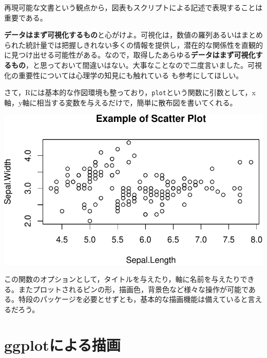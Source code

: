 \documentclass[
  a4paper,
]{ltjsbook}
\newenvironment{Shaded}{\begin{snugshade}}{\end{snugshade}}
\newcommand{\AttributeTok}[1]{\textcolor[rgb]{0.40,0.45,0.13}{#1}}
\newcommand{\FunctionTok}[1]{\textcolor[rgb]{0.28,0.35,0.67}{#1}}
\newcommand{\NormalTok}[1]{\textcolor[rgb]{0.00,0.23,0.31}{#1}}
\newcommand{\SpecialCharTok}[1]{\textcolor[rgb]{0.37,0.37,0.37}{#1}}
\newcommand{\StringTok}[1]{\textcolor[rgb]{0.13,0.47,0.30}{#1}}
\begin{document}
再現可能な文書という観点から，図表もスクリプトによる記述で表現することは重要である。

\textbf{データはまず可視化するもの}と心がけよ。可視化は，数値の羅列あるいはまとめられた統計量では把握しきれない多くの情報を提供し，潜在的な関係性を直観的に見つけ出せる可能性がある。なので，取得したあらゆる\textbf{データはまず可視化するもの}，と思っておいて間違いはない。大事なことなので二度言いました。可視化の重要性については心理学の知見にも触れている\autocite{Kieran2018}
も参考にしてほしい。

さて，Rには基本的な作図環境も整っており，\texttt{plot}という関数に引数として，x軸，y軸に相当する変数を与えるだけで，簡単に散布図を書いてくれる。

\begin{Shaded}
\end{Shaded}

\includegraphics{chapter04_files/figure-pdf/RplotSample-1.pdf}

この関数のオプションとして，タイトルを与えたり，軸に名前を与えたりできる。またプロットされるピンの形，描画色，背景色など様々な操作が可能である。特段のパッケージを必要とせずとも，基本的な描画機能は備えていると言えるだろう。

\section{ggplotによる描画}\label{ggplotux306bux3088ux308bux63cfux753b}
\end{document}
